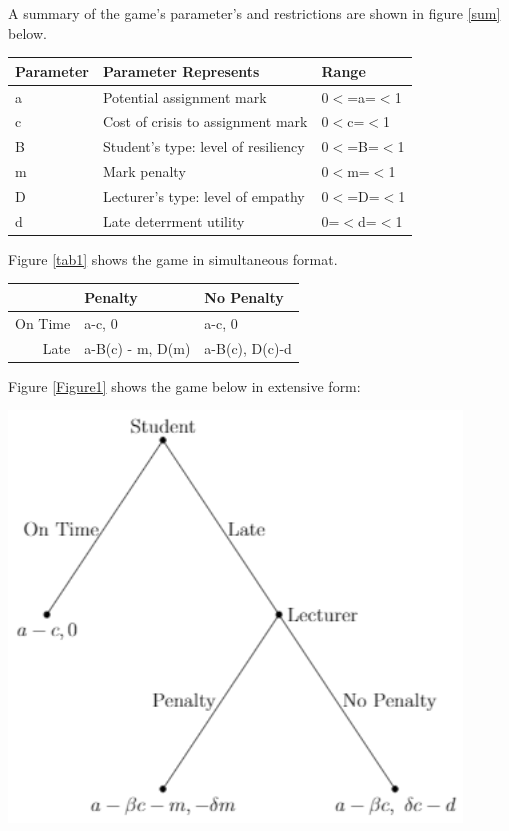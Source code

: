 \documentclass[11pt,preprint, authoryear]{elsarticle}
\let\origfigure\figure
\let\endorigfigure\endfigure
\renewenvironment{figure}[1][2] {
    \expandafter\origfigure\expandafter[H]
} {
    \endorigfigure
}
\let\origtable\table
\let\endorigtable\endtable
\renewenvironment{table}[1][2] {
    \expandafter\origtable\expandafter[H]
} {
    \endorigtable
}
\numberwithin{equation}{section}
\numberwithin{figure}{section}
\numberwithin{table}{section}
\begin{document}
A summary of the game's parameter's and restrictions are shown in figure
\ref{sum} below.

\begin{table}[H]
\centering
\begin{tabular}{lll}
  \toprule
Parameter & Parameter Represents & Range \\ 
  \midrule
a & Potential assignment mark & 0$<$=a=$<$1 \\ 
  c & Cost of crisis to assignment mark & 0$<$c=$<$1 \\ 
  B & Student's type: level of resiliency & 0$<$=B=$<$1 \\ 
  m & Mark penalty & 0$<$m=$<$1 \\ 
  D & Lecturer's type: level of empathy & 0$<$=D=$<$1 \\ 
  d & Late deterrment utility & 0=$<$d=$<$1 \\ 
   \bottomrule
\end{tabular}
\caption{Summary of Game Parameters \label{sum}} 
\end{table}

Figure \ref{tab1} shows the game in simultaneous format.

\begin{table}[H]
\centering
\begin{tabular}{rll}
  \toprule
 & Penalty & No Penalty \\ 
  \midrule
On Time & a-c, 0 & a-c, 0 \\ 
  Late & a-B(c) - m, D(m) & a-B(c), D(c)-d \\ 
   \bottomrule
\end{tabular}
\caption{Simultaneous Game \label{tab1}} 
\end{table}

Figure \ref{Figure1} shows the game below in extensive form:

\begin{figure}[H]

{\centering \includegraphics[width=4.74in]{img/tree} 

}

\caption{Game Tree \label{Figure1}}\label{fig:Figure1}
\end{figure}
\end{document}
